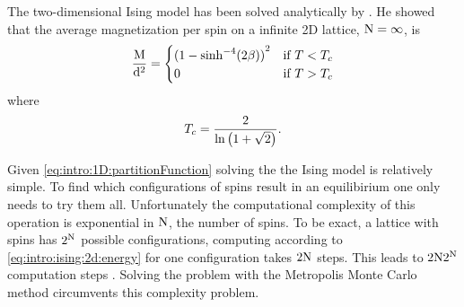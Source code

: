 	The two-dimensional Ising model has been solved analytically by \textcite{onsager1944crystal}. He showed that the average magnetization per spin on a infinite 2D lattice, \ie $\mathrm{N} = \infty$, is
	\begin{equation}
		\label{eq:intro:ising:2D:magnetizationAnalytical}
		\frac{\mathrm{M}}{\mathrm{d}^2} = \begin{cases}
			{(1 - {\sinh}^{-4}(2\beta))}^2 & \text{if } T < T_{c}\\
			0 								& \text{if } T > T_{c}
		\end{cases}
	\end{equation}
	where
	\begin{equation*}
		T_{c} = \frac{2}{\ln \left(1 + \sqrt{2}\right)}.
	\end{equation*}

	Given \cref{eq:intro:1D:partitionFunction} solving the the Ising model is relatively simple. To find which configurations of spins result in an equilibirium one only needs to try them all. Unfortunately the computational complexity of this operation is exponential in $\mathrm{N}$, the number of spins. To be exact, a lattice with \numberOfSpins spins has $2^\mathrm{N}$ possible configurations, computing \energy according to \cref{eq:intro:ising:2d:energy} for one configuration takes $2\mathrm{N}$ steps. This leads to $2\mathrm{N}2^\mathrm{N}$ computation steps \cite{kenzel1997physics}. Solving the problem with the Metropolis Monte Carlo method circumvents this complexity problem. 